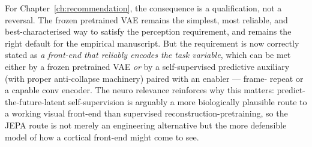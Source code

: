 For Chapter~\ref{ch:recommendation}, the consequence is a qualification, not a reversal. The
frozen pretrained VAE remains the simplest, most reliable, and best-characterised way to satisfy
the perception requirement, and remains the right default for the empirical manuscript. But the
requirement is now correctly stated as \emph{a front-end that reliably encodes the task
variable}, which can be met either by a frozen pretrained VAE \emph{or} by a self-supervised
predictive auxiliary (with proper anti-collapse machinery) paired with an enabler --- frame-
repeat or a capable conv encoder. The neuro relevance reinforces why this matters:
predict-the-future-latent self-supervision is arguably a more biologically plausible route to a
working visual front-end than supervised reconstruction-pretraining, so the JEPA route is not
merely an engineering alternative but the more defensible model of how a cortical front-end might
come to see.
